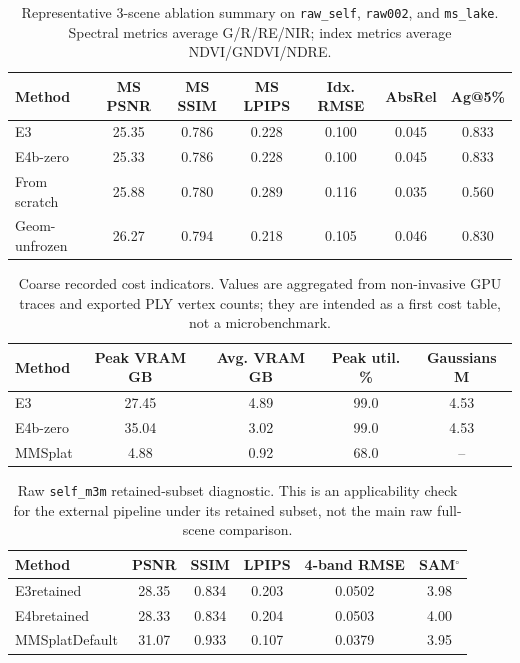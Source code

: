 \begin{table}[t]
    \caption{Representative 3-scene ablation summary on \texttt{raw\_self}, \texttt{raw002}, and \texttt{ms\_lake}. Spectral metrics average G/R/RE/NIR; index metrics average NDVI/GNDVI/NDRE.}
    \label{tab:ablations3}
    \centering
    \scriptsize
    \begin{tabular}{lcccccc}
        \toprule
        Method & MS PSNR & MS SSIM & MS LPIPS & Idx. RMSE & AbsRel & Ag@5\% \\
        \midrule
        E3 & 25.35 & 0.786 & 0.228 & 0.100 & 0.045 & 0.833 \\
        E4b-zero & 25.33 & 0.786 & 0.228 & 0.100 & 0.045 & 0.833 \\
        From scratch & 25.88 & 0.780 & 0.289 & 0.116 & 0.035 & 0.560 \\
        Geom-unfrozen & 26.27 & 0.794 & 0.218 & 0.105 & 0.046 & 0.830 \\
        \bottomrule
    \end{tabular}
\end{table}

\begin{table}[t]
    \caption{Coarse recorded cost indicators. Values are aggregated from non-invasive GPU traces and exported PLY vertex counts; they are intended as a first cost table, not a microbenchmark.}
    \label{tab:cost}
    \centering
    \scriptsize
    \begin{tabular}{lcccc}
        \toprule
        Method & Peak VRAM GB & Avg. VRAM GB & Peak util. \% & Gaussians M \\
        \midrule
        E3 & 27.45 & 4.89 & 99.0 & 4.53 \\
        E4b-zero & 35.04 & 3.02 & 99.0 & 4.53 \\
        MMSplat & 4.88 & 0.92 & 68.0 & -- \\
        \bottomrule
    \end{tabular}
\end{table}

\begin{table}[t]
    \caption{Raw \texttt{self\_m3m} retained-subset diagnostic. This is an applicability check for the external pipeline under its retained subset, not the main raw full-scene comparison.}
    \label{tab:retained-self}
    \centering
    \scriptsize
    \begin{tabular}{lccccc}
        \toprule
        Method & PSNR & SSIM & LPIPS & 4-band RMSE & SAM$^\circ$ \\
        \midrule
        E3retained & 28.35 & 0.834 & 0.203 & 0.0502 & 3.98 \\
        E4bretained & 28.33 & 0.834 & 0.204 & 0.0503 & 4.00 \\
        MMSplatDefault & 31.07 & 0.933 & 0.107 & 0.0379 & 3.95 \\
        \bottomrule
    \end{tabular}
\end{table}


